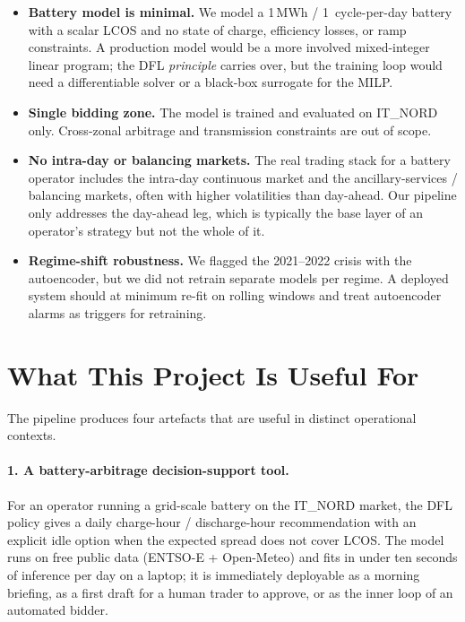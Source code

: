 \documentclass[11pt,a4paper]{article}
\begin{document}
\begin{itemize}[leftmargin=1.5em]
  \item \textbf{Battery model is minimal.} We model a 1\,MWh /
    1~cycle-per-day battery with a scalar LCOS and no state of charge,
    efficiency losses, or ramp constraints. A production model would be
    a more involved mixed-integer linear program; the DFL
    \emph{principle} carries over, but the training loop would need a
    differentiable solver or a black-box surrogate for the MILP.

  \item \textbf{Single bidding zone.} The model is trained and
    evaluated on IT\_NORD only. Cross-zonal arbitrage and transmission
    constraints are out of scope.

  \item \textbf{No intra-day or balancing markets.} The real trading
    stack for a battery operator includes the intra-day continuous
    market and the ancillary-services / balancing markets, often with
    higher volatilities than day-ahead. Our pipeline only addresses the
    day-ahead leg, which is typically the base layer of an operator's
    strategy but not the whole of it.

  \item \textbf{Regime-shift robustness.} We flagged the 2021--2022
    crisis with the autoencoder, but we did not retrain separate models
    per regime. A deployed system should at minimum re-fit on rolling
    windows and treat autoencoder alarms as triggers for retraining.
\end{itemize}


\section{What This Project Is Useful For}

The pipeline produces four artefacts that are useful in distinct
operational contexts.

\paragraph{1. A battery-arbitrage decision-support tool.}
For an operator running a grid-scale battery on the IT\_NORD market,
the DFL policy gives a daily charge-hour / discharge-hour recommendation
with an explicit idle option when the expected spread does not cover
LCOS. The model runs on free public data (ENTSO-E + Open-Meteo) and
fits in under ten seconds of inference per day on a laptop; it is
immediately deployable as a morning briefing, as a first draft for a
human trader to approve, or as the inner loop of an automated bidder.
\end{document}
